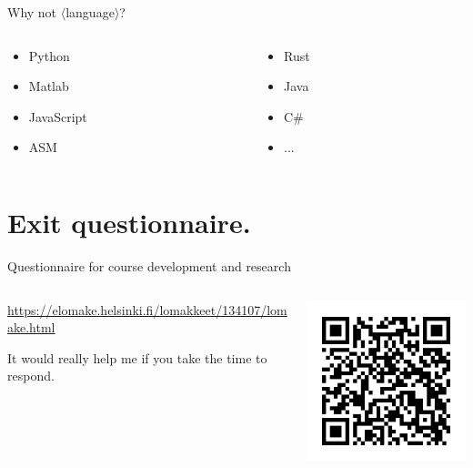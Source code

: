 \documentclass[11pt, aspectratio=169, table]{beamer}
\begin{document}
\begin{frame}{Why not $\langle$language$\rangle$?}
\begin{columns}
\begin{column}{0.5\textwidth}
\begin{itemize}
	\item Python
	\item Matlab
	\item JavaScript
	\item ASM
\end{itemize}
\end{column}
\begin{column}{0.5\textwidth}
\begin{itemize}
	\item Rust
	\item Java
	\item C\#
	\item ...
\end{itemize}
\end{column}
\end{columns}
\end{frame}

\section{Exit questionnaire.}
\begin{frame}{Questionnaire for course development and research}
\begin{columns}
\begin{column}{0.4\textwidth}
\setlength\parskip{1em}
\url{https://elomake.helsinki.fi/lomakkeet/134107/lomake.html}

It would really help me if you take the time to respond.
\end{column}
\begin{column}{0.6\textwidth}
\begin{center}
\includegraphics[width=0.5\columnwidth]{elomakeqr}
\end{center}
\end{column}
\end{columns}
\end{frame}
\end{document}
